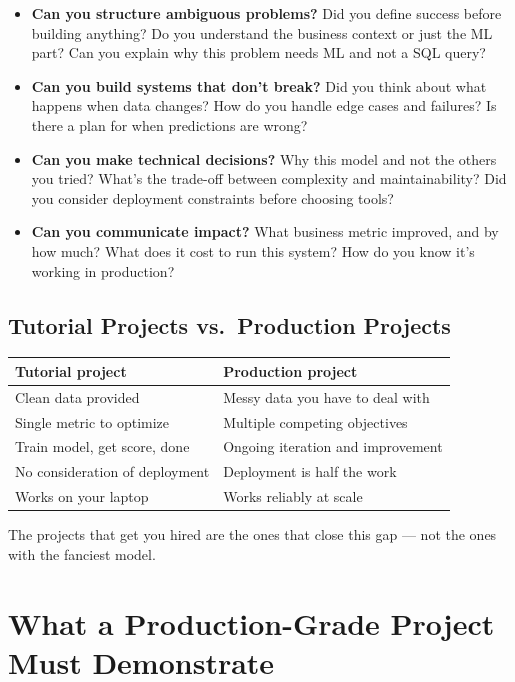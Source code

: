 \begin{itemize}
  \item \textbf{Can you structure ambiguous problems?} Did you define success before building anything? Do you
  understand the business context or just the ML part? Can you explain why this problem needs ML and not a SQL
  query?
  \item \textbf{Can you build systems that don't break?} Did you think about what happens when data changes? How
  do you handle edge cases and failures? Is there a plan for when predictions are wrong?
  \item \textbf{Can you make technical decisions?} Why this model and not the others you tried? What's the
  trade-off between complexity and maintainability? Did you consider deployment constraints before choosing
  tools?
  \item \textbf{Can you communicate impact?} What business metric improved, and by how much? What does it cost
  to run this system? How do you know it's working in production?
\end{itemize}

\subsection{Tutorial Projects vs.\ Production Projects}

\begin{longtable}{p{} p{}}
\toprule
\textbf{Tutorial project} & \textbf{Production project} \\
\midrule
\endhead
Clean data provided & Messy data you have to deal with \\
Single metric to optimize & Multiple competing objectives \\
Train model, get score, done & Ongoing iteration and improvement \\
No consideration of deployment & Deployment is half the work \\
Works on your laptop & Works reliably at scale \\
\bottomrule
\end{longtable}

\begin{keytakeaway}
The projects that get you hired are the ones that close this gap --- not the ones with the fanciest model.
\end{keytakeaway}

\section{What a Production-Grade Project Must Demonstrate}

